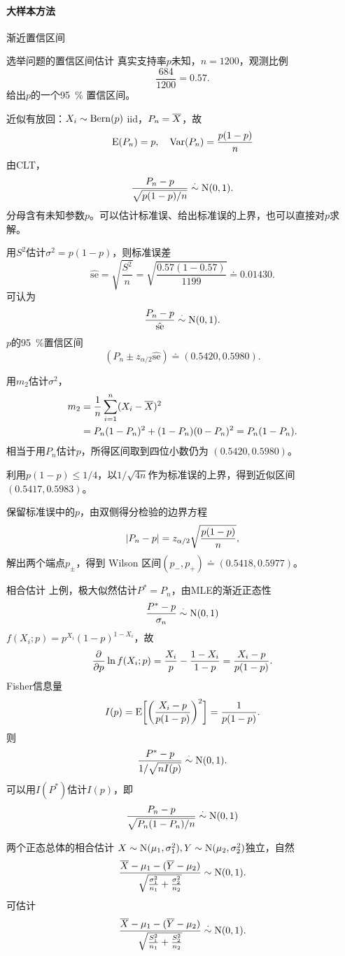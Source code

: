 \paragraph{大样本方法}
渐近置信区间
\begin{example}{选举问题的置信区间估计}{}
	真实支持率$p$未知，$n = 1200$，观测比例
	\[
		\frac{684}{1200} = 0.57.
	\]
	给出$p$的一个\qty{95}{\percent} 置信区间。

	近似有放回：$X_i \sim \operatorname{Bern}(p)$ iid，$P_n = \overline{X}$，故
	\[
		\operatorname{E}(P_n) = p,\quad\operatorname{Var}(P_n) = \frac{p(1 - p)}n
	\]
	由CLT，
	\[
		\frac{P_n - p}{\sqrt{p(1 - p)/n}} \overset{\cdot}{\sim} \operatorname{N}(0,1).
	\]
	分母含有未知参数$p$。可以估计标准误、给出标准误的上界，也可以直接对$p$求解。
	\begin{compactenum}[I]
		\item 用$S^2$估计$\sigma^2 = p(1 - p)$，则标准误差
			\[
				\hat{\mathrm{se}} = \sqrt{\frac{S^2}n} = \sqrt{\frac{0.57(1 - 0.57)}{1199}} \doteq 0.01430.
			\]
			可认为
			\[
				\frac{P_n - p}{\hat{\mathrm{se}}} \overset{\cdot}{\sim} \operatorname{N}(0,1).
			\]
			$p$的\qty{95}{\percent}置信区间
			\[
				(P_n \pm z_{\alpha/2}\hat{\mathrm{se}}) \doteq (0.5420,0.5980).
			\]
		\item 用$m_2$估计$\sigma^2$，
			\begin{align*}
				m_2 &= \frac1n\sum_{i=1}^n(X_i - \overline{X})^2\\
				&= P_n(1 - P_n)^2 + (1 - P_n)(0 - P_n)^2 = P_n(1 - P_n).
			\end{align*}
			相当于用$P_n$估计$p$，所得区间取到四位小数仍为 $(0.5420,0.5980)$。
		\item 利用$p(1 - p) \le 1/4$，以$1/\sqrt{4n}$作为标准误的上界，得到近似区间$(0.5417,0.5983)$。
		\item 保留标准误中的$p$，由双侧得分检验的边界方程
		\[
			\lvert P_n - p\rvert = z_{\alpha/2}\sqrt{\frac{p(1 - p)}n},
		\]
		解出两个端点$p_\pm$，得到 Wilson 区间$(p_-,p_+) \doteq (0.5418,0.5977)$。
	\end{compactenum}
\end{example}
\begin{example}{相合估计}{}
	上例，极大似然估计$P^\ast = P_n$，由MLE的渐近正态性
	\[
		\frac{P^\ast - p}{\sigma_n} \overset{\cdot}{\sim} \operatorname{N}(0,1)
	\]
	$f(X_i;p) = p^{X_i}(1 - p)^{1-X_i}$，故
	\[
		\frac{\partial^{}}{\partial{p}^{}}\ln f(X_i;p) = \frac{X_i}p - \frac{1 - X_i}{1 - p} = \frac{X_i - p}{p(1 - p)}.
	\]
	Fisher信息量
	\begin{equation}\label{eq:ps-bernoulli-fisher-information}
		I(p) = \operatorname{E}\biggl[\biggl(\frac{X_i - p}{p(1 - p)}\biggr)^2\biggr] = \frac1{p(1 - p)}.
	\end{equation}
	则
	\[
		\frac{P^\ast - p}{1/\sqrt{nI(p)}} \overset{\cdot}{\sim} \operatorname{N}(0,1).
	\]
	可以用$I(P^\ast)$估计$I(p)$，即
	\[
		\frac{P_n - p}{\sqrt{P_n(1 - P_n)/n}} \overset{\cdot}{\sim} \operatorname{N}(0,1)
	\]
\end{example}
\begin{example}{两个正态总体的相合估计}{}
	$X \sim \operatorname{N}(\mu_1,\sigma_1^2),Y \sim \operatorname{N}(\mu_2,\sigma_2^2)$独立，自然
	\[
		\frac{\overline{X} - \mu_1 - (\overline{Y} - \mu_2)}{\sqrt{\frac{\sigma_1^2}{n_1} + \frac{\sigma_2^2}{n_2}}} \sim \operatorname{N}(0,1).
	\]
	可估计
	\[
		\frac{\overline{X} - \mu_1 - (\overline{Y} - \mu_2)}{\sqrt{\frac{S_1^2}{n_1} + \frac{S_2^2}{n_2}}} \overset{\cdot}{\sim} \operatorname{N}(0,1).
	\]
\end{example}
